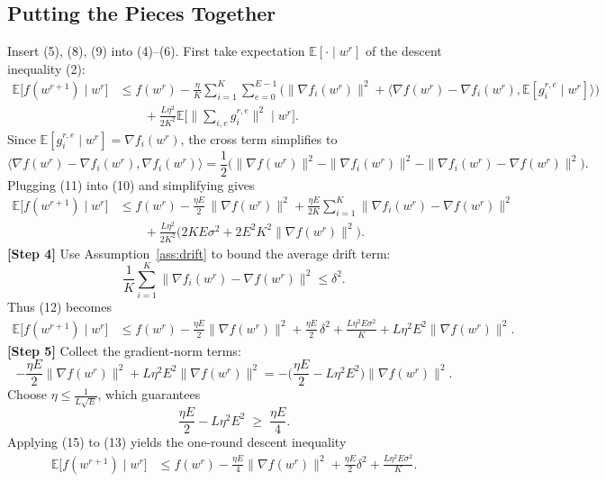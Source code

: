\documentclass{article}
\newcommand{\EE}{\mathbb{E}}
\begin{document}
\subsection*{Putting the Pieces Together}
Insert (5), (8), (9) into (4)–(6). First take expectation $\EE[\cdot\mid w^{r}]$ of the descent inequality (2):
\begin{align}
\EE\!\big[f(w^{r+1})\mid w^{r}\big]
 &\le f(w^{r})
    -\frac{\eta}{K}\sum_{i=1}^{K}\sum_{e=0}^{E-1}
      \Big(\|\nabla f_i(w^{r})\|^{2}
          +\big\langle\nabla f(w^{r})-\nabla f_i(w^{r}),
                 \EE[g_{i}^{r,e}\mid w^{r}]\big\rangle\Big)
    \nonumber\\
 &\qquad +\frac{L\eta^{2}}{2K^{2}}
        \EE\!\Big[\Big\|\sum_{i,e} g_{i}^{r,e}\Big\|^{2}\mid w^{r}\Big]. \tag{10}
\end{align}
Since $\EE[g_{i}^{r,e}\mid w^{r}]=\nabla f_i(w^{r})$, the cross term simplifies to
\[
\big\langle\nabla f(w^{r})-\nabla f_i(w^{r}),\nabla f_i(w^{r})\big\rangle
 =\frac12\!\Big(\|\nabla f(w^{r})\|^{2}
               -\|\nabla f_i(w^{r})\|^{2}
               -\|\nabla f_i(w^{r})-\nabla f(w^{r})\|^{2}\Big). \tag{11}
\]
Plugging (11) into (10) and simplifying gives
\begin{align}
\EE\!\big[f(w^{r+1})\mid w^{r}\big]
 &\le f(w^{r})
    -\frac{\eta E}{2}\,\|\nabla f(w^{r})\|^{2}
    +\frac{\eta E}{2K}\sum_{i=1}^{K}\|\nabla f_i(w^{r})-\nabla f(w^{r})\|^{2}
    \nonumber\\
 &\qquad +\frac{L\eta^{2}}{2K^{2}}
    \Big(2 K E\sigma^{2}+2E^{2}K^{2}\|\nabla f(w^{r})\|^{2}\Big). \tag{12}
\end{align}
\noindent\textbf{[Step 4]} Use Assumption~\ref{ass:drift} to bound the average drift term:
\[
\frac1K\sum_{i=1}^{K}\|\nabla f_i(w^{r})-\nabla f(w^{r})\|^{2}\le\delta^{2}.
\]
Thus (12) becomes
\begin{align}
\EE\!\big[f(w^{r+1})\mid w^{r}\big]
 &\le f(w^{r})
    -\frac{\eta E}{2}\|\nabla f(w^{r})\|^{2}
    +\frac{\eta E}{2}\,\delta^{2}
    +\frac{L\eta^{2}E\sigma^{2}}{K}
    +L\eta^{2}E^{2}\|\nabla f(w^{r})\|^{2}. \tag{13}
\end{align}
\noindent\textbf{[Step 5]} Collect the gradient‑norm terms:
\[
    -\frac{\eta E}{2}\|\nabla f(w^{r})\|^{2}
    +L\eta^{2}E^{2}\|\nabla f(w^{r})\|^{2}
   = -\Big(\frac{\eta E}{2}-L\eta^{2}E^{2}\Big)\|\nabla f(w^{r})\|^{2}. \tag{14}
\]
Choose $\eta\le\frac{1}{L\sqrt{E}}$, which guarantees
\[
    \frac{\eta E}{2}-L\eta^{2}E^{2}
    \;\ge\;\frac{\eta E}{4}. \tag{15}
\]
Applying (15) to (13) yields the one‑round descent inequality
\begin{align}
\EE\!\big[f(w^{r+1})\mid w^{r}\big]
 &\le f(w^{r})
    -\frac{\eta E}{4}\|\nabla f(w^{r})\|^{2}
    +\frac{\eta E}{2}\delta^{2}
    +\frac{L\eta^{2}E\sigma^{2}}{K}. \tag{16}
\end{align}
\end{document}
